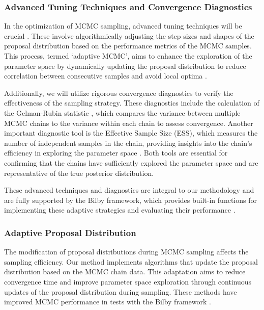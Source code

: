 \documentclass[12pt]{article}
\begin{document}
\subsubsection{Advanced Tuning Techniques and Convergence Diagnostics}

In the optimization of MCMC sampling, advanced tuning techniques will be crucial \cite{Luengo2020}. These involve algorithmically adjusting the step sizes and shapes of the proposal distribution based on the performance metrics of the MCMC samples. This process, termed `adaptive MCMC',\cite{Haario2001, Roberts2009} aims to enhance the exploration of the parameter space by dynamically updating the proposal distribution to reduce correlation between consecutive samples and avoid local optima \cite{Kramer2014}.

Additionally, we will utilize rigorous convergence diagnostics to verify the effectiveness of the sampling strategy. These diagnostics include the calculation of the Gelman-Rubin statistic \cite{GelmanRubin1992}, which compares the variance between multiple MCMC chains to the variance within each chain to assess convergence. Another important diagnostic tool is the Effective Sample Size (ESS), which measures the number of independent samples in the chain, providing insights into the chain's efficiency in exploring the parameter space \cite{vanderSluys2008}. Both tools are essential for confirming that the chains have sufficiently explored the parameter space and are representative of the true posterior distribution.

These advanced techniques and diagnostics are integral to our methodology and are fully supported by the Bilby framework, which provides built-in functions for implementing these adaptive strategies and evaluating their performance \cite{Bilby-MCMC, Smith2016}.

\subsubsection{Adaptive Proposal Distribution}
The modification of proposal distributions during MCMC sampling affects the sampling efficiency. Our method implements algorithms that update the proposal distribution based on the MCMC chain data. This adaptation aims to reduce convergence time and improve parameter space exploration through continuous updates of the proposal distribution during sampling. These methods have improved MCMC performance in tests with the Bilby framework \cite{Bilby-MCMC, Bilby: A user-friendly}.
\end{document}
